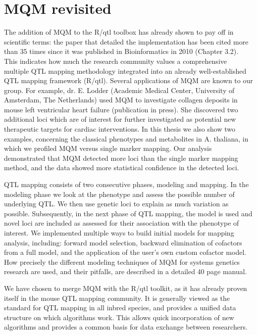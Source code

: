 \section{MQM revisited}
The addition of MQM to the R/qtl toolbox has already shown to pay off in scientific terms: the paper that detailed the implementation 
has been cited more than 35 times since it was published in Bioinformatics in 2010 (Chapter 3.2). This indicates how much the research 
community values a comprehensive multiple QTL mapping methodology integrated into an already well-established QTL mapping framework 
(R/qtl). Several applications of MQM are known to our group. For example, dr. E. Lodder (Academic Medical Center, University of 
Amsterdam, The Netherlands) used MQM to investigate collagen deposits in mouse left ventricular heart failure (publication in press). 
She discovered two additional loci which are of interest for further investigated as potential new therapeutic targets for cardiac 
interventions. In this thesis we also show two examples, concerning the classical phenotypes and metabolites in A. thaliana, in which 
we profiled MQM versus single marker mapping. Our analysis demonstrated that MQM detected more loci than the single marker mapping 
method, and the data showed more statistical confidence in the detected loci.

QTL mapping consists of two consecutive phases, modeling and mapping. In the modeling phase we look at the phenotype and assess the 
possible number of underlying QTL. We then use genetic loci to explain as much variation as possible. Subsequently, in the next phase 
of QTL mapping, the model is used and novel loci are included as assessed for their association with the phenotype of interest. We 
implemented multiple ways to build initial models for mapping analysis, including: forward model selection, backward elimination of 
cofactors from a full model, and the application of the user’s own custom cofactor model. How precisely the different modeling 
techniques of MQM for systems genetics research are used, and their pitfalls, are described in a detailed 40 page manual.

We have chosen to merge MQM with the R/qtl toolkit, as it has already proven itself in the mouse QTL mapping community. It is generally 
viewed as the standard for QTL mapping in all inbred species, and provides a unified data structure on which algorithms work. This 
allows quick incorporation of new algorithms and provides a common basis for data exchange between researchers. 

